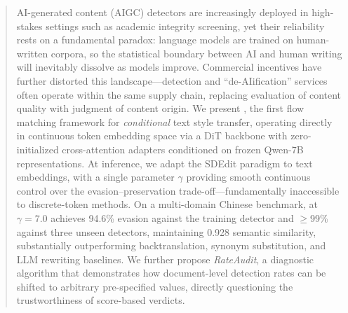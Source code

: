 \begin{abstract}
    AI-generated content (AIGC) detectors are increasingly deployed in 
    high-stakes settings such as academic integrity screening, yet their 
    reliability rests on a fundamental paradox: language models are trained 
    on human-written corpora, so the statistical boundary between AI and 
    human writing will inevitably dissolve as models improve. Commercial 
    incentives have further distorted this landscape---detection and 
    ``de-AIification'' services often operate within the same supply chain, 
    replacing evaluation of content quality with judgment of content origin.
    We present \styleshield{}, the first flow matching framework for 
    \emph{conditional} text style transfer, operating directly in continuous 
    token embedding space via a DiT backbone with zero-initialized 
    cross-attention adapters conditioned on frozen Qwen-7B representations. 
    At inference, we adapt the SDEdit paradigm to text embeddings, with a 
    single parameter $\gamma$ providing smooth continuous control over the 
    evasion--preservation trade-off---fundamentally inaccessible to 
    discrete-token methods. On a multi-domain Chinese benchmark, 
    \styleshield{} at $\gamma{=}7.0$ achieves 94.6\% evasion against the 
    training detector and $\geq$99\% against three unseen detectors, 
    maintaining 0.928 semantic similarity, substantially outperforming 
    backtranslation, synonym substitution, and LLM rewriting baselines. 
    We further propose \emph{RateAudit}, a diagnostic algorithm
    that demonstrates how document-level detection rates can be
    shifted to arbitrary pre-specified values, directly
    questioning the trustworthiness of score-based verdicts.
    \end{abstract}